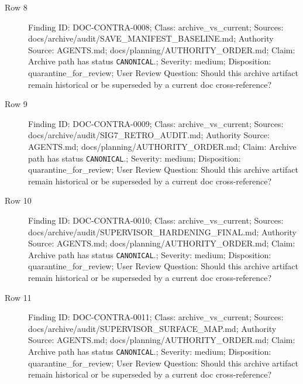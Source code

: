 \documentclass[10.5pt,a4paper,openany]{book}
\begin{document}
\begin{description}
\item[Row 8] Finding ID: DOC-\allowbreak{}CONTRA-\allowbreak{}0008; Class: archive\_\allowbreak{}vs\_\allowbreak{}current; Sources: docs/\allowbreak{}archive/\allowbreak{}audit/\allowbreak{}SAVE\_\allowbreak{}MANIFEST\_\allowbreak{}BASELINE.\allowbreak{}md; Authority Source: AGENTS.\allowbreak{}md; docs/\allowbreak{}planning/\allowbreak{}AUTHORITY\_\allowbreak{}ORDER.\allowbreak{}md; Claim: Archive path has status \texttt{CANONICAL}.\allowbreak{}; Severity: medium; Disposition: quarantine\_\allowbreak{}for\_\allowbreak{}review; User Review Question: Should this archive artifact remain historical or be superseded by a current doc cross-\allowbreak{}reference?
\item[Row 9] Finding ID: DOC-\allowbreak{}CONTRA-\allowbreak{}0009; Class: archive\_\allowbreak{}vs\_\allowbreak{}current; Sources: docs/\allowbreak{}archive/\allowbreak{}audit/\allowbreak{}SIG7\_\allowbreak{}RETRO\_\allowbreak{}AUDIT.\allowbreak{}md; Authority Source: AGENTS.\allowbreak{}md; docs/\allowbreak{}planning/\allowbreak{}AUTHORITY\_\allowbreak{}ORDER.\allowbreak{}md; Claim: Archive path has status \texttt{CANONICAL}.\allowbreak{}; Severity: medium; Disposition: quarantine\_\allowbreak{}for\_\allowbreak{}review; User Review Question: Should this archive artifact remain historical or be superseded by a current doc cross-\allowbreak{}reference?
\item[Row 10] Finding ID: DOC-\allowbreak{}CONTRA-\allowbreak{}0010; Class: archive\_\allowbreak{}vs\_\allowbreak{}current; Sources: docs/\allowbreak{}archive/\allowbreak{}audit/\allowbreak{}SUPERVISOR\_\allowbreak{}HARDENING\_\allowbreak{}FINAL.\allowbreak{}md; Authority Source: AGENTS.\allowbreak{}md; docs/\allowbreak{}planning/\allowbreak{}AUTHORITY\_\allowbreak{}ORDER.\allowbreak{}md; Claim: Archive path has status \texttt{CANONICAL}.\allowbreak{}; Severity: medium; Disposition: quarantine\_\allowbreak{}for\_\allowbreak{}review; User Review Question: Should this archive artifact remain historical or be superseded by a current doc cross-\allowbreak{}reference?
\item[Row 11] Finding ID: DOC-\allowbreak{}CONTRA-\allowbreak{}0011; Class: archive\_\allowbreak{}vs\_\allowbreak{}current; Sources: docs/\allowbreak{}archive/\allowbreak{}audit/\allowbreak{}SUPERVISOR\_\allowbreak{}SURFACE\_\allowbreak{}MAP.\allowbreak{}md; Authority Source: AGENTS.\allowbreak{}md; docs/\allowbreak{}planning/\allowbreak{}AUTHORITY\_\allowbreak{}ORDER.\allowbreak{}md; Claim: Archive path has status \texttt{CANONICAL}.\allowbreak{}; Severity: medium; Disposition: quarantine\_\allowbreak{}for\_\allowbreak{}review; User Review Question: Should this archive artifact remain historical or be superseded by a current doc cross-\allowbreak{}reference?

\end{description}
\end{document}
